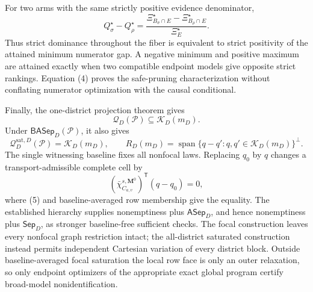 For two arms with the same strictly positive evidence denominator,
\[
Q_\sigma^\star-Q_\rho^\star
=\frac{\Xi_{B_\sigma\cap E}^\star-
\Xi_{B_\rho\cap E}^\star}{\Xi_E^\star}.
\tag{4}
\]
Thus strict dominance throughout the fiber is equivalent to strict positivity of the attained minimum numerator gap.  A negative minimum and positive maximum are attained exactly when two compatible endpoint models give opposite strict rankings.  Equation (4) proves the safe-pruning characterization without conflating numerator optimization with the causal conditional.

Finally, the one-district projection theorem gives
\[
\mathcal Q_D(\mathcal P)\subseteq\mathcal K_D(m_D).
\]
Under \(\mathsf{BASep}_D(\mathcal P)\), it also gives
\[
\mathcal Q_D^{\mathrm{sat},D}(\mathcal P)=\mathcal K_D(m_D),
\qquad
R_D(m_D)=\operatorname{span}\{q-q':q,q'\in\mathcal K_D(m_D)\}^{\perp}.
\tag{5}
\]
The single witnessing baseline fixes all nonfocal laws.  Replacing \(q_0\) by \(q\) changes a transport-admissible complete cell by
\[
(\bar\chi_{C_{a,v}}^{s,\mathbf M^0})^{\mathsf T}(q-q_0)=0,
\]
where (5) and baseline-averaged row membership give the equality.  The established hierarchy supplies nonemptiness plus \(\mathsf{ASep}_D\), and hence nonemptiness plus \(\mathsf{Sep}_D\), as stronger baseline-free sufficient checks.  The focal construction leaves every nonfocal graph restriction intact; the all-district saturated construction instead permits independent Cartesian variation of every district block.  Outside baseline-averaged focal saturation the local row face is only an outer relaxation, so only endpoint optimizers of the appropriate exact global program certify broad-model nonidentification.